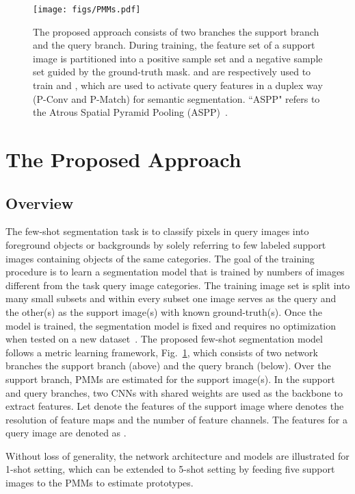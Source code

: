 \documentclass[runningheads]{llncs}
\begin{document}
\begin{figure}[t]
\centering
\texttt{[image: figs/PMMs.pdf]}
\caption{The proposed approach consists of two branches  the support branch and the query branch. During training, the feature set  of a support image is partitioned into a positive sample set  and a negative sample set  guided by the ground-truth mask.  and  are respectively used to train  and , which are used to activate query features in a duplex way (P-Conv and P-Match) for semantic segmentation. 
``ASPP" refers to the Atrous Spatial Pyramid Pooling (ASPP)~\cite{DeepLabV2}.}
\label{fig:flowchart}
\vspace{-0.2cm}
\end{figure}


\section{The Proposed Approach}

\subsection{Overview}
The few-shot segmentation task is to classify pixels in query images into foreground objects or backgrounds by solely referring to few labeled support images containing objects of the same categories. 
The goal of the training procedure is to learn a segmentation model that is trained by numbers of images different from the task query image categories.
The training image set is split into many small subsets and within every subset one image serves as the query and the other(s) as the support image(s) with known ground-truth(s).
Once the model is trained, the segmentation model is fixed and requires no optimization when tested on a new dataset~\cite{CaNet}.
The proposed few-shot segmentation model follows a metric learning framework, Fig.\ \ref{fig:flowchart}, which consists of two network branches  the support branch (above) and the query branch (below). Over the support branch, PMMs are estimated for the support image(s).
In the support and query branches, two CNNs with shared weights are used as the backbone to extract features.
Let  denote the features of the support image where  denotes the resolution of feature maps and  the number of feature channels. The features for a query image are denoted as . 

Without loss of generality, the network architecture and models are illustrated for 1-shot setting, which can be extended to 5-shot setting by feeding five support images to the PMMs to estimate prototypes.
\end{document}
